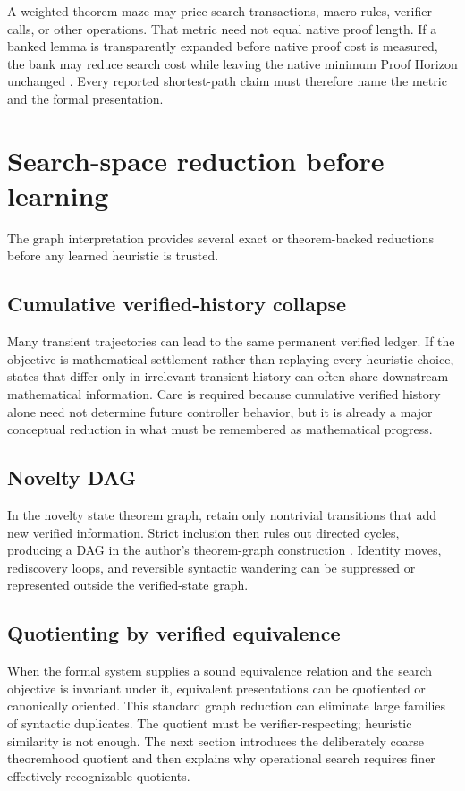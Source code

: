 \begin{caution}
A weighted theorem maze may price search transactions, macro rules, verifier calls, or other operations. That metric need not equal native proof length. If a banked lemma is transparently expanded before native proof cost is measured, the bank may reduce search cost while leaving the native minimum Proof Horizon unchanged \cite{data3}. Every reported shortest-path claim must therefore name the metric and the formal presentation.
\end{caution}

\section{Search-space reduction before learning}
The graph interpretation provides several exact or theorem-backed reductions before any learned heuristic is trusted.

\subsection{Cumulative verified-history collapse}
Many transient trajectories can lead to the same permanent verified ledger. If the objective is mathematical settlement rather than replaying every heuristic choice, states that differ only in irrelevant transient history can often share downstream mathematical information. Care is required because cumulative verified history alone need not determine future controller behavior, but it is already a major conceptual reduction in what must be remembered as mathematical progress.

\subsection{Novelty DAG}
In the novelty state theorem graph, retain only nontrivial transitions that add new verified information. Strict inclusion then rules out directed cycles, producing a DAG in the author's theorem-graph construction \cite{depths}. Identity moves, rediscovery loops, and reversible syntactic wandering can be suppressed or represented outside the verified-state graph.

\subsection{Quotienting by verified equivalence}
When the formal system supplies a sound equivalence relation and the search objective is invariant under it, equivalent presentations can be quotiented or canonically oriented. This standard graph reduction can eliminate large families of syntactic duplicates. The quotient must be verifier-respecting; heuristic similarity is not enough. The next section introduces the deliberately coarse theoremhood quotient and then explains why operational search requires finer effectively recognizable quotients.

